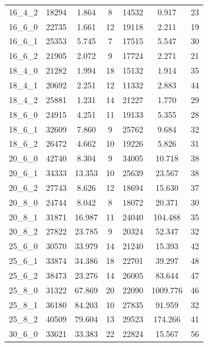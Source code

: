 \documentclass[preprint,12pt,authoryear]{elsarticle}
\begin{document}
\begin{table}[h!]
{\begin{tabular}{|c||c|c|c||c|c|c|}
16\_4\_2 & 18294 &     1.864 &        8 		& 14532 &     0.917 &       23 \\
16\_6\_0 & 22735 &     1.661 &       12 		& 19118 &     2.211 &       19 \\
16\_6\_1 & 25353 &     5.745 &        7 		& 17515 &     5.547 &       30 \\
16\_6\_2 & 21905 &     2.072 &        9 		& 17724 &     2.271 &       21 \\
\hline
18\_4\_0 & 21282 &     1.994 &       18 		& 15132 &     1.914 &       35 \\
18\_4\_1 & 20692 &     2.251 &       12 		& 11332 &     2.883 &       44 \\
18\_4\_2 & 25881 &     1.231 &       14 		& 21227 &     1.770 &       29 \\
18\_6\_0 & 24915 &     4.251 &       11 		& 19133 &     5.355 &       28 \\
18\_6\_1 & 32609 &     7.860 &        9 		& 25762 &     9.684 &       32 \\
18\_6\_2 & 26472 &     4.662 &       10 		& 19226 &     5.826 &       31 \\
\hline
20\_6\_0 & 42740 &     8.304 &        9 		& 34005 &    10.718 &       38 \\
20\_6\_1 & 34333 &    13.353 &       10 		& 25639 &    23.567 &       38 \\
20\_6\_2 & 27743 &     8.626 &       12 		& 18694 &    15.630 &       37 \\
20\_8\_0 & 24744 &     8.042 &        8 		& 18072 &    20.371 &       30 \\
20\_8\_1 & 31871 &    16.987 &       11 		& 24040 &   104.488 &       35 \\
20\_8\_2 & 27822 &    23.785 &        9 		& 20324 &    52.347 &       32 \\
\hline
25\_6\_0 & 30570 &    33.979 &       14 		& 21240 &    15.393 &       42 \\
25\_6\_1 & 33874 &    34.386 &       18 		& 22701 &    39.297 &       48 \\
25\_6\_2 & 38473 &    23.276 &       14 		& 26005 &    83.644 &       47 \\
25\_8\_0 & 31322 &    67.869 &       20 		& 22090 &  1009.776 &       46 \\
25\_8\_1 & 36180 &    84.203 &       10 		& 27835 &    91.959 &       32 \\
25\_8\_2 & 40509 &    79.604 &       13 		& 29523 &   174.266 &       41 \\
\hline
30\_6\_0 & 33621 &    33.383 &       22 		& 22824 &    15.567 &       56 \\

\end{tabular}}
\end{table}
\end{document}

